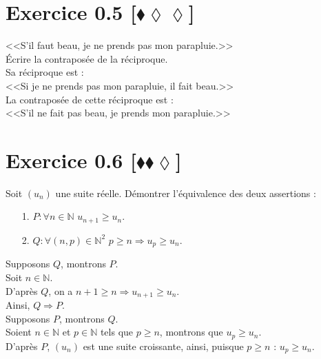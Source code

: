 \documentclass[10pt]{article}
\begin{document}
\section*{Exercice 0.5 [$\blacklozenge\lozenge\lozenge$]}
\begin{tcolorbox}[enhanced, width=6in, center, size=fbox, fontupper=\large, drop shadow southwest]
    <<S'il faut beau, je ne prends pas mon parapluie.>>\\
    Écrire la contraposée de la réciproque.\\[0.5cm]
    Sa réciproque est :\\
    <<Si je ne prends pas mon parapluie, il fait beau.>>\\[0.5cm]
    La contraposée de cette réciproque est :\\
    <<S'il ne fait pas beau, je prends mon parapluie.>>
\end{tcolorbox}

\section*{Exercice 0.6 [$\blacklozenge\blacklozenge\lozenge$]}
\begin{tcolorbox}[enhanced, width=6in, center, size=fbox, fontupper=\large, drop shadow southwest]
    Soit $(u_n)$ une suite réelle. Démontrer l'équivalence des deux assertions :
    \begin{itemize}
        \item[1.] $P:\forall{n\in\mathbb{N}}$ \hspace{0.25cm} $u_{n+1} \geq u_n$. 
        \item[2.] $Q:\forall{(n,p)\in\mathbb{N}^2}$ \hspace{0.25cm} $p \geq n \Longrightarrow u_p \geq u_n$. 
    \end{itemize}
    Supposons $Q$, montrons $P$.\\
    Soit $n\in\mathbb{N}$.\\
    D'après $Q$, on a $n+1\geq n \Longrightarrow u_{n+1} \geq u_n$.\\
    Ainsi, $Q\Longrightarrow P$.\\[0.5cm]
    Supposons $P$, montrons $Q$.\\
    Soient $n\in\mathbb{N}$ et $p\in\mathbb{N}$ tels que $p\geq n$, montrons que $u_p\geq u_n$.\\
    D'après $P$, $(u_n)$ est une suite croissante, ainsi, puisque $p\geq n$ : $u_p\geq u_n$.
    \end{tcolorbox}
\end{document}
